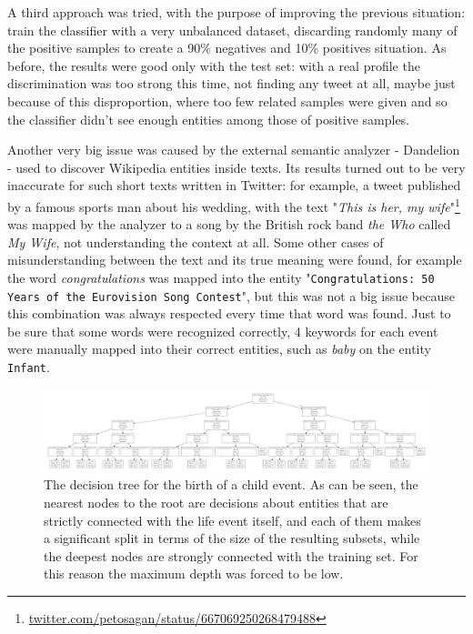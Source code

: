 A third approach was tried, with the purpose of improving the previous situation: train the classifier with a very unbalanced dataset, discarding randomly many of the positive samples to create a 90\% negatives and 10\% positives situation. As before, the results were good only with the test set: with a real profile the discrimination was too strong this time, not finding any tweet at all, maybe just because of this disproportion, where too few related samples were given and so the classifier didn't see enough entities among those of positive samples.

Another very big issue was caused by the external semantic analyzer - Dandelion - used to discover Wikipedia entities inside texts. Its results turned out to be very inaccurate for such short texts written in Twitter: for example, a tweet published by a famous sports man about his wedding, with the text "\textit{This is her, my wife}"\footnote{\url{twitter.com/petosagan/status/667069250268479488}} was mapped by the analyzer to a song by the British rock band \emph{the Who} called \emph{My Wife}, not understanding the context at all. Some other cases of misunderstanding between the text and its true meaning were found, for example the word \emph{congratulations} was mapped into the entity "\texttt{Congratulations: 50 Years of the Eurovision Song Contest}", but this was not a big issue because this combination was always respected every time that word was found. Just to be sure that some words were recognized correctly, 4 keywords for each event were manually mapped into their correct entities, such as \emph{baby} on the entity \texttt{Infant}.

\begin{figure}
\centering
\includegraphics[width=%
1\textwidth]{img/decisiontree}
\caption{The decision tree for the birth of a child event. As can be seen, the nearest nodes to the root are decisions about entities that are strictly connected with the life event itself, and each of them makes a significant split in terms of the size of the resulting subsets, while the deepest nodes are strongly connected with the training set. For this reason the maximum depth was forced to be low.}
\label{fig:decisiontree}
\end{figure}

